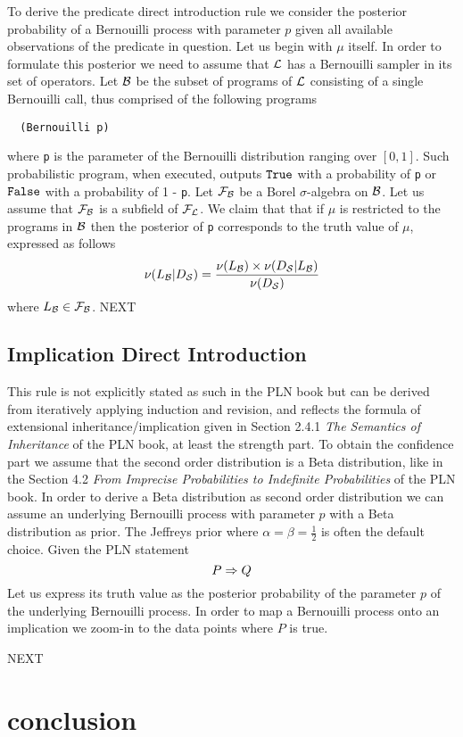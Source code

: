 \documentclass[]{article}
\begin{document}
To derive the predicate direct introduction rule we consider the
posterior probability of a Bernouilli process with parameter $p$ given
all available observations of the predicate in question.  Let us begin
with $\mu$ itself.  In order to formulate this posterior we need to
assume that $\mathcal{L}$ has a Bernouilli sampler in its set of
operators.  Let $\mathcal{B}$ be the subset of programs of $\mathcal{L}$
consisting of a single Bernouilli call, thus comprised of the
following programs
\begin{verbatim}
  (Bernouilli p)
\end{verbatim}
where \texttt{p} is the parameter of the Bernouilli
distribution ranging over $[0, 1]$.  Such probabilistic program, when
executed, outputs $\texttt{True}$ with a probability of \texttt{p} or
$\texttt{False}$ with a probability of 1 - \texttt{p}.  Let
$\mathcal{F}_{\mathcal{B}}$ be a Borel $\sigma$-algebra on $\mathcal{B}$.
Let us assume that $\mathcal{F}_{\mathcal{B}}$ is a subfield of
$\mathcal{F}_{\mathcal{L}}$.  We claim that that if $\mu$ is restricted to
the programs in $\mathcal{B}$ then the posterior of
\texttt{p} corresponds to the truth value of $\mu$,
expressed as follows
$$\nu(L_{\mathcal{B}} | D_{\mathcal{S}}) = \frac{\nu(L_{\mathcal{B}}) \times
  \nu(D_{\mathcal{S}} | L_{\mathcal{B}})}{\nu(D_{\mathcal{S}})}$$ where $L_{\mathcal{B}}
\in \mathcal{F}_{\mathcal{B}}$.  NEXT

\subsection{Implication Direct Introduction}
\label{sec:impldirect}
This rule is not explicitly stated as such in the PLN book but can be
derived from iteratively applying induction and revision, and reflects
the formula of extensional inheritance/implication given in Section
2.4.1 \emph{The Semantics of Inheritance} of the PLN book, at least
the strength part.  To obtain the confidence part we assume that the
second order distribution is a Beta distribution, like in the Section
4.2 \emph{From Imprecise Probabilities to Indefinite Probabilities} of
the PLN book.  In order to derive a Beta distribution as second order
distribution we can assume an underlying Bernouilli process with
parameter $p$ with a Beta distribution as prior.  The Jeffreys prior
where $\alpha=\beta=\frac{1}{2}$ is often the default choice.  Given
the PLN statement
$$P \Rightarrow Q$$ Let us express its truth value as the posterior
probability of the parameter $p$ of the underlying Bernouilli process.
In order to map a Bernouilli process onto an implication we zoom-in to
the data points where $P$ is true.

NEXT

\section{conclusion}



\end{document}
